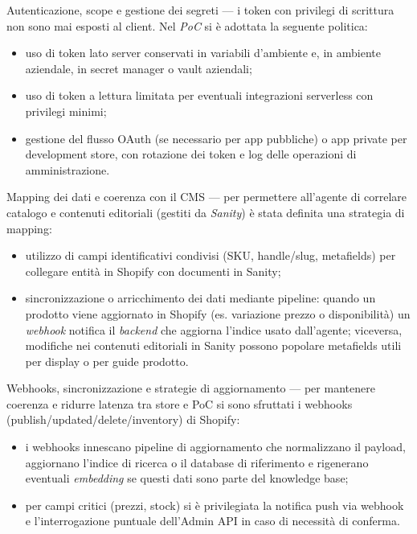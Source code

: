 Autenticazione, scope e gestione dei segreti — i token con privilegi di scrittura non sono mai esposti al client. Nel \emph{PoC} si è adottata la seguente politica:
\begin{itemize}
\item uso di token lato server conservati in variabili d'ambiente e, in ambiente aziendale, in secret manager o vault aziendali;
\item uso di token a lettura limitata per eventuali integrazioni serverless con privilegi minimi;
\item gestione del flusso OAuth (se necessario per app pubbliche) o app private per development store, con rotazione dei token e log delle operazioni di amministrazione.
\end{itemize}

Mapping dei dati e coerenza con il CMS — per permettere all'agente di correlare catalogo e contenuti editoriali (gestiti da \emph{Sanity}) è stata definita una strategia di mapping:
\begin{itemize}
\item utilizzo di campi identificativi condivisi (SKU, handle/slug, metafields) per collegare entità in Shopify con documenti in Sanity;
\item sincronizzazione o arricchimento dei dati mediante pipeline: quando un prodotto viene aggiornato in Shopify (es. variazione prezzo o disponibilità) un \emph{webhook} notifica 
il \emph{backend} che aggiorna l'indice usato dall'agente; viceversa, modifiche nei contenuti editoriali in Sanity possono popolare metafields utili per display o per guide prodotto.
\end{itemize}

Webhooks, sincronizzazione e strategie di aggiornamento — per mantenere coerenza e ridurre latenza tra store e PoC si sono sfruttati i webhooks (publish/updated/delete/inventory) di Shopify:
\begin{itemize}
\item i webhooks innescano pipeline di aggiornamento che normalizzano il payload, aggiornano l'indice di ricerca o il database di riferimento e rigenerano eventuali 
\emph{embedding} se questi dati sono parte del knowledge base;
\item per campi critici (prezzi, stock) si è privilegiata la notifica push via webhook e l'interrogazione puntuale dell'Admin API in caso di necessità di conferma.
\end{itemize}

